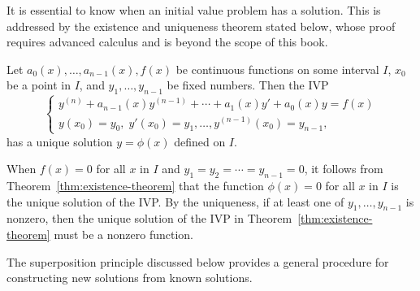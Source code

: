 It is essential to know when an initial value problem has a solution. This is addressed by the existence and uniqueness theorem stated below, whose proof requires advanced calculus and is beyond the scope of this book.


\begin{theorem}\label{thm:existence-theorem}
	Let    \( a_0(x), \dots, a_{n-1}(x), f(x) \)  be continuous functions on some interval \( I \), $x_0$ be a point in $I$, and $y_1,\dots, y_{n-1}$ be fixed numbers. Then the IVP 
	\[ 
		\begin{cases}
		y^{(n)} + a_{n-1}(x)y^{(n-1)} + \cdots + a_1(x)y' + a_0(x)y = f(x)\\ y(x_0) = y_0,\;  y'(x_0) = y_1, \dots, y^{(n-1)}(x_0) = y_{n-1},
		\end{cases}
	\]
	 has a unique solution  \(y = \phi(x) \) defined on $I.$ 
\end{theorem}

\begin{remark}
When $f(x)=0
$ for all $x$ in $I$ and $y_1=y_2 =\cdots = y_{n-1} = 0$, it follows from Theorem~\ref{thm:existence-theorem} that the  function $\phi(x) =0$ for all $x$ in $I$ is the unique solution of the IVP.   By the uniqueness,
if at least one of $y_1, \dots, y_{n-1}$ is nonzero, then the unique solution of the IVP in Theorem~\ref{thm:existence-theorem} must be a nonzero function.
\end{remark}

 


The superposition principle discussed below provides a general procedure for constructing new solutions from known solutions.

